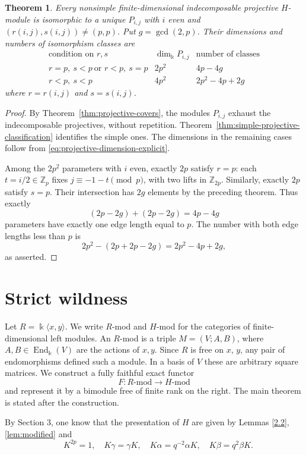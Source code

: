 \documentclass[10pt,oneside]{amsart}
\newcommand{\kk}{\Bbbk}
\newcommand{\Z}{\mathbb Z}
\newtheorem{theorem}[proposition]{Theorem}
\theoremstyle{definition}
\begin{document}
\begin{theorem}\label{thm:nonsimple-projective-dimensions}
Every nonsimple finite-dimensional indecomposable projective
$H$-module is isomorphic to a unique $P_{i,j}$ with $i$ even and
$(r(i,j),s(i,j))\ne(p,p)$. Put $g=\gcd(2,p)$. Their dimensions
and numbers of isomorphism classes are
\[
\begin{array}{c|c|c}
 \text{condition on }r,s&\dim_{\kk}P_{i,j}&
       \text{number of classes}\\\hline
 r=p,\ s<p\ \text{or }r<p,\ s=p&2p^2&4p-4g\\
 r<p,\ s<p&4p^2&2p^2-4p+2g
\end{array}
\]
where $r=r(i,j)$ and $s=s(i,j)$.
\end{theorem}
\begin{proof}
By Theorem~\ref{thm:projective-covers}, the modules $P_{i,j}$
exhaust the indecomposable projectives, without repetition.
Theorem~\ref{thm:simple-projective-classification} identifies the
simple ones. The dimensions in the remaining cases follow from
\eqref{eq:projective-dimension-explicit}.

Among the $2p^2$ parameters with $i$ even, exactly $2p$ satisfy
$r=p$: each $t=i/2\in\Z_p$ fixes $j\equiv-1-t\pmod p$, with
two lifts in $\Z_{2p}$. Similarly, exactly $2p$ satisfy $s=p$.
Their intersection has $2g$ elements by the preceding theorem.
Thus exactly
\[
 (2p-2g)+(2p-2g)=4p-4g
\]
parameters have exactly one edge length equal to $p$.
The number with both edge lengths less than $p$ is
\[
 2p^2-(2p+2p-2g)=2p^2-4p+2g,
\]
as asserted.
\end{proof}




\section{Strict wildness}\label{sec:wildness}
Let $R=\kk\langle x,y\rangle$. We write $R$-mod and $H$-mod for the
categories of finite-dimensional left modules. An $R$-mod
is a triple $M=(V;A,B)$, where $A,B\in\operatorname{End}_{\kk}(V)$
are the actions of $x,y$. Since $R$ is free on $x$, $y$, any pair of endomorphisms defined such a module.  In a basis of $V$ these are arbitrary square matrices.
We construct a fully faithful exact functor
\[F:R\text{-mod}\longrightarrow H\text{-mod}\]
and represent it by a bimodule free of finite rank on the right.
The main theorem is stated after the construction.

By Section 3, one know that
the presentation of $H$ are given by  Lemmas \ref{2.2}, \ref{lem:modified}
 and \[\quad K^{2p}=1,\quad K\gamma=\gamma K,\quad
 K\alpha=q^{-2}\alpha K,\quad K\beta=q^2\beta K.
\]
\end{document}
